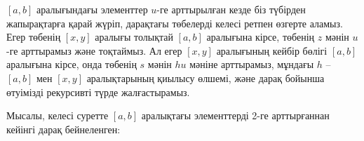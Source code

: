$[a,b]$ аралығындағы элементтер $u$-ге арттырылған кезде
біз түбірден жапырақтарға қарай жүріп, дарақтағы төбелерді
келесі ретпен өзгерте аламыз.
Егер төбенің $[x,y]$ аралығы толықтай $[a,b]$ аралығына кірсе,
төбенің $z$ мәнін $u$-ге арттырамыз және тоқтаймыз. 
Ал егер $[x,y]$ аралығының
кейбір бөлігі $[a,b]$ аралығына кірсе, онда төбенің
$s$ мәнін $hu$ мәніне арттырамыз, мұндағы $h$ -- $[a,b]$ мен 
$[x,y]$ аралықтарының қиылысу өлшемі, және дарақ
бойынша өтуімізді рекурсивті түрде жалғастырамыз. 



Мысалы, келесі суретте $[a,b]$ аралықтағы элементтерді 2-ге 
арттырғаннан кейінгі дарақ бейнеленген:

